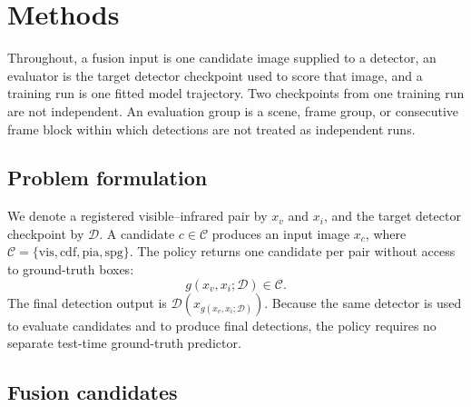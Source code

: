 \documentclass[preprint,11pt]{elsarticle}
\begin{document}
\section{Methods}

Throughout, a fusion input is one candidate image supplied to a detector, an
evaluator is the target detector checkpoint used to score that image, and a
training run is one fitted model trajectory. Two checkpoints from one training
run are not independent. An evaluation group is a scene, frame group, or
consecutive frame block within which detections are not treated as independent
runs.

\subsection{Problem formulation}

We denote a registered visible--infrared pair by \(x_v\) and \(x_i\), and the
target detector checkpoint by \(\mathcal{D}\). A candidate
\(c\in\mathcal{C}\) produces an input image \(x_c\), where
\(\mathcal{C}=\{\mathrm{vis},\mathrm{cdf},\mathrm{pia},\mathrm{spg}\}\).
The policy returns one candidate per pair without access to ground-truth boxes:
\begin{equation}
g(x_v,x_i;\mathcal{D})\in\mathcal{C}.
\end{equation}
The final detection output is
\(\mathcal{D}(x_{g(x_v,x_i;\mathcal{D})})\). Because the same detector is used
to evaluate candidates and to produce final detections, the policy requires no
separate test-time ground-truth predictor.

\subsection{Fusion candidates}
\end{document}
